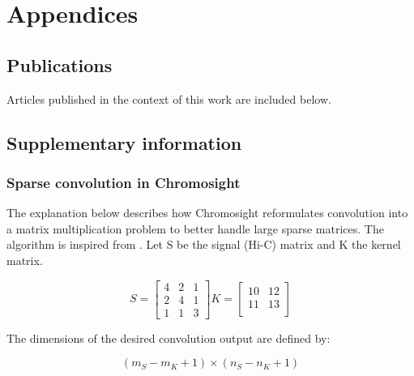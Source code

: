 \ctpartquote{}
\ctparttext{}
\part{Appendices}

\chapter{Publications}
 \label{ch:04-A:publications}
    Articles published in the context of this work are included below.

    

\chapter{Supplementary information}
\label{ch:04-B:supdata}

    \section{Sparse convolution in Chromosight}
    \label{sec:04-B-01:convolution}

The explanation below describes how Chromosight reformulates convolution into a matrix multiplication problem to better handle large sparse matrices. The algorithm is inspired from \cite{NeuralNetwork2D}. Let S be the signal (Hi-C) matrix and K the kernel matrix.

\begin{equation}
    S = 
    \begin{bmatrix}
        4 & 2 & 1 \\
        2 & 4 & 1 \\
        1 & 1 & 3
    \end{bmatrix}
    K =
    \begin{bmatrix}
        10 & 12 \\
        11 & 13 \\
    \end{bmatrix}
\end{equation}

The dimensions of the desired convolution output are defined by:

\begin{equation}
    (m_S - m_K + 1) \times (n_S - n_K + 1)
\end{equation}

